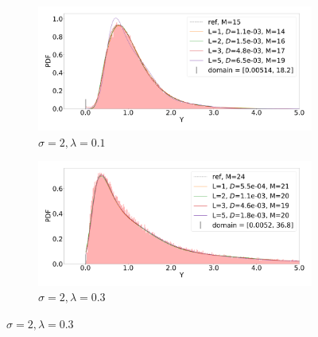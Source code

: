 \documentclass{article}
\begin{document}
\begin{figure}[!htp]
\centering
\begin{subfigure}{0.5\textwidth}
  \includegraphics[width=\linewidth]{porous_media_flow/MLMC/cl_0_1_s_2.pdf}
  \caption{$\sigma = 2, \lambda=0.1$}
  \label{fig:cl_0_1_s_2}
\end{subfigure}\hfil
\centering
\begin{subfigure}{0.5\textwidth}
  \includegraphics[width=\linewidth]{porous_media_flow/MLMC/cl_0_3_s_2.pdf}
  \caption{$\sigma = 2, \lambda=0.3$}
  \label{fig:cl_0_3_s_2}
\end{subfigure}\hfil 


\end{figure}
\end{document}
